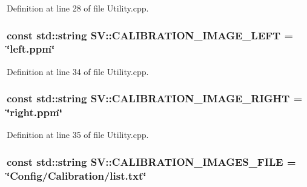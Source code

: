 Definition at line 28 of file Utility.\-cpp.

\hypertarget{namespace_s_v_a7eee3c30084ee151a5d8e793f448dfca}{
\subsubsection[{C\-A\-L\-I\-B\-R\-A\-T\-I\-O\-N\-\_\-\-I\-M\-A\-G\-E\-\_\-\-L\-E\-F\-T}]{\setlength{\rightskip}{0pt plus 5cm}const std\-::string S\-V\-::\-C\-A\-L\-I\-B\-R\-A\-T\-I\-O\-N\-\_\-\-I\-M\-A\-G\-E\-\_\-\-L\-E\-F\-T = \char`\"{}left.\-ppm\char`\"{}}}\label{namespace_s_v_a7eee3c30084ee151a5d8e793f448dfca}


Definition at line 34 of file Utility.\-cpp.

\hypertarget{namespace_s_v_a6b93f40cb116005baad0fa89d5e3ded3}{
\subsubsection[{C\-A\-L\-I\-B\-R\-A\-T\-I\-O\-N\-\_\-\-I\-M\-A\-G\-E\-\_\-\-R\-I\-G\-H\-T}]{\setlength{\rightskip}{0pt plus 5cm}const std\-::string S\-V\-::\-C\-A\-L\-I\-B\-R\-A\-T\-I\-O\-N\-\_\-\-I\-M\-A\-G\-E\-\_\-\-R\-I\-G\-H\-T = \char`\"{}right.\-ppm\char`\"{}}}\label{namespace_s_v_a6b93f40cb116005baad0fa89d5e3ded3}


Definition at line 35 of file Utility.\-cpp.

\hypertarget{namespace_s_v_a31f33ecf5d55099dbdcbf01cbdc8f85e}{
\subsubsection[{C\-A\-L\-I\-B\-R\-A\-T\-I\-O\-N\-\_\-\-I\-M\-A\-G\-E\-S\-\_\-\-F\-I\-L\-E}]{\setlength{\rightskip}{0pt plus 5cm}const std\-::string S\-V\-::\-C\-A\-L\-I\-B\-R\-A\-T\-I\-O\-N\-\_\-\-I\-M\-A\-G\-E\-S\-\_\-\-F\-I\-L\-E = \char`\"{}Config/Calibration/list.\-txt\char`\"{}}}\label{namespace_s_v_a31f33ecf5d55099dbdcbf01cbdc8f85e}


